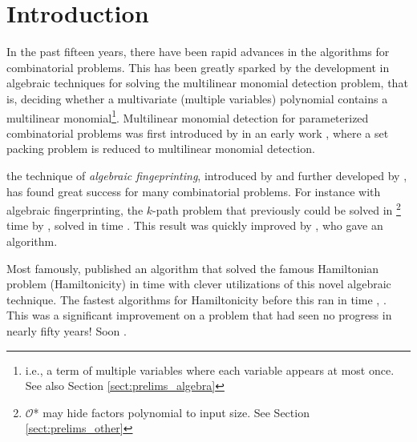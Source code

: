 
\section{Introduction}

In the past fifteen years, 
there have been rapid advances in the algorithms for combinatorial problems. 
This has been greatly sparked by the development in algebraic techniques for solving the 
multilinear monomial detection problem, that is, 
deciding whether a multivariate (multiple variables) 
polynomial contains a multilinear monomial\footnote{ 
i.e., a term of multiple variables where each variable appears at most once. 
See also Section \ref{sect:prelims_algebra}}. 
Multilinear monomial detection for parameterized combinatorial problems was 
first introduced by \citeauthor{Koutis05} in an early work 
\cite{Koutis05}, where a set packing problem is 
reduced to multilinear monomial detection.

 the technique of \emph{algebraic fingeprinting},   
introduced by \citeauthor{Koutis08} \cite{Koutis08} and further developed by 
\citeauthor{Williams09} \cite{Williams09}, 
has found great success for many combinatorial problems. 
For instance with algebraic fingerprinting, the $k$-path problem 
that previously could be solved in
\footnote{$\mathcal{O}$* may hide factors polynomial to input size. 
See Section \ref{sect:prelims_other}} 
time by \citeauthor{Chen07} \cite{Chen07}, 
 solved in  time \cite{Koutis08}. 
This result was quickly improved by \textcite{Williams09}, %
who gave an  algorithm.

Most famously, 
\citeauthor{Björklund14} \cite{Björklund14} published an algorithm 
that solved the famous Hamiltonian problem (Hamiltonicity) in  time 
with clever utilizations of this novel algebraic technique. 
The fastest algorithms for Hamiltonicity before this ran in  time
\cite{HelKar62}, \cite{Bellman62}. 
This was a significant improvement on a problem 
that had seen no progress in nearly fifty years! 
Soon
 \cite{Björklund17}.

